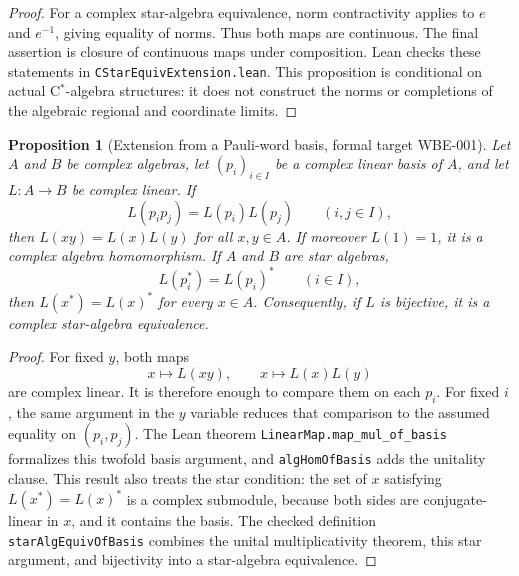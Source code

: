 \documentclass{article}
\newtheorem{proposition}[definition]{Proposition}
\begin{document}
\begin{proof}
For a complex star-algebra equivalence, norm contractivity applies to $e$ and
$e^{-1}$, giving equality of norms.  Thus both maps are continuous.  The
final assertion is closure of continuous maps under composition.  Lean checks
these statements in \texttt{CStarEquivExtension.lean}.  This proposition is
conditional on actual C$^*$-algebra structures: it does not construct the
norms or completions of the algebraic regional and coordinate limits.
\end{proof}

\begin{proposition}[Extension from a Pauli-word basis, formal target WBE-001]
\label{prop:word_basis_extension}
Let $A$ and $B$ be complex algebras, let $(p_i)_{i\in I}$ be a complex linear
basis of $A$, and let $L:A\to B$ be complex linear.  If
\begin{equation*}
  L(p_i p_j)=L(p_i)L(p_j)
  \qquad (i,j\in I),
\end{equation*}
then $L(xy)=L(x)L(y)$ for all $x,y\in A$.  If moreover $L(1)=1$, it is a
complex algebra homomorphism.  If $A$ and $B$ are star algebras,
\begin{equation*}
  L(p_i^*)=L(p_i)^*
  \qquad (i\in I),
\end{equation*}
then $L(x^*)=L(x)^*$ for every $x\in A$.  Consequently, if $L$ is bijective,
it is a complex star-algebra equivalence.
\end{proposition}

\begin{proof}
For fixed $y$, both maps
\begin{equation*}
  x\longmapsto L(xy),
  \qquad
  x\longmapsto L(x)L(y)
\end{equation*}
are complex linear.  It is therefore enough to compare them on each $p_i$.
For fixed $i$, the same argument in the $y$ variable reduces that comparison
to the assumed equality on $(p_i,p_j)$.  The Lean theorem
\texttt{LinearMap.map\_mul\_of\_basis} formalizes this twofold basis
argument, and \texttt{algHomOfBasis} adds the unitality clause.  This result
also treats the star condition: the set of $x$ satisfying
$L(x^*)=L(x)^*$ is a complex submodule, because both sides are
conjugate-linear in $x$, and it contains the basis.  The checked definition
\texttt{starAlgEquivOfBasis} combines the unital multiplicativity theorem,
this star argument, and bijectivity into a star-algebra equivalence.
\end{proof}
\end{document}
